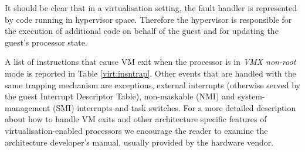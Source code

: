 It should be clear that in a virtualisation setting, the fault handler is represented by code running in hypervisor space. Therefore the hypervisor is responsible for the execution of additional code on behalf of the guest and for updating the guest's processor state.

A list of instructions that cause VM exit when the processor is in \emph{VMX non-root} mode is reported in Table \ref{virt:insntrap}. Other events that are handled with the same trapping mechanism are exceptions, external interrupts (otherwise served by the guest Interrupt Descriptor Table), non-maskable (NMI) and system-management (SMI) interrupts and task switches. For a more detailed description about how to handle VM exits and other architecture specific features of virtualisation-enabled processors we encourage the reader to examine the architecture developer's manual, usually provided by the hardware vendor.

